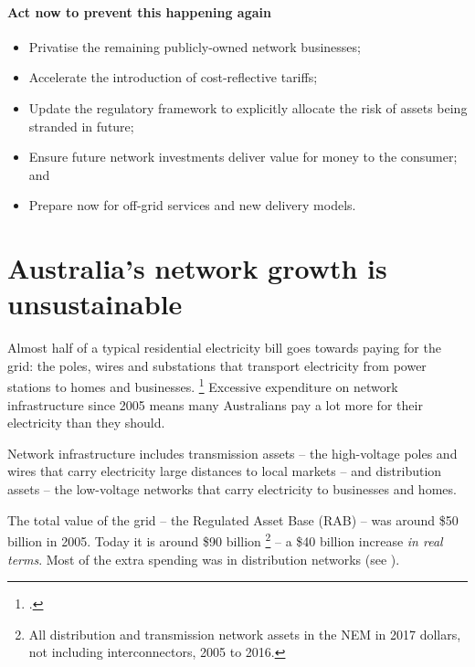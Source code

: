 \documentclass[FrontPage]{grattan}
\begin{document}
\begin{recommendations}
\subsubsection{Act now to prevent this happening again}
\begin{itemize}
 \item Privatise the remaining publicly-owned network businesses;
 \item Accelerate the introduction of cost-reflective tariffs;
 \item Update the regulatory framework to explicitly allocate the risk of assets being stranded in future; 
 \item Ensure future network investments deliver value for money to the consumer; and
 \item Prepare now for off-grid services and new delivery models.
\end{itemize}

\end{recommendations}


\contentspage

\chapter{Australia's network growth is unsustainable}\label{chap:australias-network-growth-is-unsustainable}

Almost half of a typical residential electricity bill goes towards paying for the grid: the poles, wires and substations that transport electricity from power stations to homes and businesses.%
\footcites[][38]{AEMC2017PriceTrends}{ACCC2017ElectricityInterimReport}
Excessive expenditure on network infrastructure since 2005 means many Australians pay a lot more for their electricity than they should.

Network infrastructure includes transmission assets -- the high-voltage poles and wires that carry electricity large distances to local markets -- and distribution assets -- the low-voltage networks that carry electricity to businesses and homes.

The total value of the grid -- the Regulated Asset Base (RAB) -- was around \$50 billion in 2005. Today it is around \$90 billion%
\footnote{All distribution and transmission network assets in the NEM in 2017 dollars, not including interconnectors, 2005 to 2016.} 
--  a \$40 billion increase \emph{in real terms}. Most of the extra spending was in distribution networks (see ).
\end{document}

